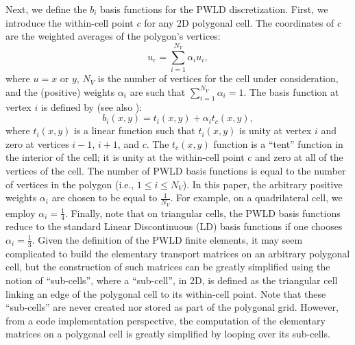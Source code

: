 \documentclass[preprint,10pt]{elsarticle}
\renewcommand{\(}{\left(}
\renewcommand{\)}{\right)}
\renewcommand{\[}{\left[}
\renewcommand{\]}{\right]}
\newcommand{\tf}{b_i}
\begin{document}
Next, we define the $\tf$ basis functions for the PWLD discretization. First, we
introduce the within-cell point $c$ for any 2D polygonal cell. The coordinates 
of $c$ are the weighted averages of the polygon's vertices:
%
\begin{equation}
  u_c = \sum_{i=1}^{N_V} \alpha_i u_i,
\end{equation}
%
where $u=x$ or $y$, $N_V$ is the number of vertices for the cell under
consideration, and the (positive) weights $\alpha_i$ are such that $\sum_{i=1}^{N_V} \alpha_i =1$. 
The basis function at vertex $i$ is defined by 
(see also \cite{pwld_2d}):
%
\begin{equation}
  b_i(x,y) = t_i(x,y) + \alpha_i t_c(x,y),
\end{equation}
%
where $t_i(x,y)$ is a linear function such that $t_i(x,y)$ is unity at vertex
$i$ and zero at vertices $i-1$, $i+1$, and $c$. The $t_c(x,y)$ function is a ``tent''
function in the interior of the cell; it is unity at the within-cell point $c$
and zero at all of the vertices of the cell. The number of PWLD basis functions is 
equal to the number of vertices in the polygon (i.e., $1 \le i \le N_V$). In this paper, the arbitrary
positive weights $\alpha_i$ are chosen to be equal to $\frac{1}{N_V}$. For example, on a
quadrilateral cell, we employ $\alpha_i =\frac{1}{4}$. Finally, note that on
triangular cells, the PWLD basis functions reduce to the
standard Linear Discontinuous (LD) basis functions if one chooses $\alpha_i = \frac{1}{3}$. 
Given the definition of the PWLD
finite elements, it may seem complicated to build the elementary transport 
matrices on an arbitrary polygonal cell, but the construction of such matrices
can be greatly simplified using the notion of ``sub-cells'', where a ``sub-cell'',
in 2D, is defined as the triangular cell linking an edge of the polygonal cell to its
within-cell point. Note that these ``sub-cells'' are never created nor stored as part of the 
polygonal grid. However, from a code implementation perspective, the computation of
the elementary matrices on a polygonal cell is greatly simplified by looping over its sub-cells. 


\end{document}
